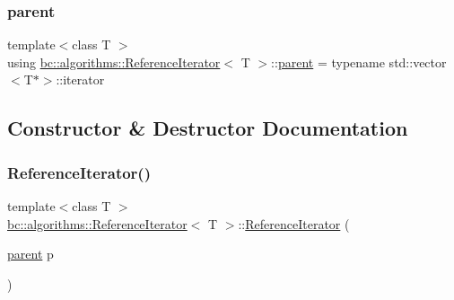 \mbox{\label{structbc_1_1algorithms_1_1ReferenceIterator_a3b90afcf3701f526f238edfb19126696}} 
\subsubsection{\texorpdfstring{parent}{parent}}
{\footnotesize\ttfamily template$<$class T $>$ \\
using \hyperlink{structbc_1_1algorithms_1_1ReferenceIterator}{bc\+::algorithms\+::\+Reference\+Iterator}$<$ T $>$\+::\hyperlink{structbc_1_1algorithms_1_1ReferenceIterator_a3b90afcf3701f526f238edfb19126696}{parent} =  typename std\+::vector$<$T$\ast$$>$\+::iterator}



\subsection{Constructor \& Destructor Documentation}
\mbox{\label{structbc_1_1algorithms_1_1ReferenceIterator_a83549088ef41105e1699406a1b3f3c76}} 
\subsubsection{\texorpdfstring{Reference\+Iterator()}{ReferenceIterator()}}
{\footnotesize\ttfamily template$<$class T $>$ \\
\hyperlink{structbc_1_1algorithms_1_1ReferenceIterator}{bc\+::algorithms\+::\+Reference\+Iterator}$<$ T $>$\+::\hyperlink{structbc_1_1algorithms_1_1ReferenceIterator}{Reference\+Iterator} (\begin{DoxyParamCaption}\item[{\hyperlink{structbc_1_1algorithms_1_1ReferenceIterator_a3b90afcf3701f526f238edfb19126696}{parent}}]{p }\end{DoxyParamCaption})\hspace{0.3cm}{\ttfamily [inline]}}



